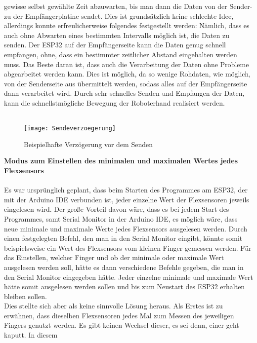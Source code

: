 \documentclass[titlepage,12pt,twoside]{article}
\begin{document}
gewisse selbst gewählte Zeit abzuwarten, bis man dann die Daten von der Sender- zu 
der Empfängerplatine sendet. Dies ist grundsätzlich keine schlechte Idee, allerdings 
konnte erfreulicherweise folgendes festgestellt werden: Nämlich, dass es auch ohne 
Abwarten eines bestimmten Intervalls möglich ist, die Daten zu senden. Der ESP32 auf 
der Empfängerseite kann die Daten genug schnell empfangen, ohne, dass ein bestimmter 
zeitlicher Abstand eingehalten werden muss. Das Beste daran ist, dass auch die 
Verarbeitung der Daten ohne Probleme abgearbeitet werden kann. Dies ist möglich, da 
so wenige Rohdaten, wie möglich, von der Senderseite aus übermittelt werden, sodass 
alles auf der Empfängerseite dann verarbeitet wird. Durch sehr schnelles Senden und 
Empfangen der Daten, kann die schnellstmögliche Bewegung der Roboterhand realisiert werden. \\
\\
\begin{figure}[H]
	\begin{center}
		\scalebox{0.5}
		{\texttt{[image: Sendeverzoegerung]}}
		\caption{Beispielhafte Verzögerung vor dem Senden}
		\label{fig:Sendeverzoegerung}			
	\end{center}
\end{figure}
\hfill \break
\textbf{Modus zum Einstellen des minimalen und maximalen Wertes jedes Flexsensors} \\
\\
Es war ursprünglich geplant, dass beim Starten des Programmes am ESP32, der mit der 
Arduino IDE verbunden ist, jeder einzelne Wert der Flexsensoren jeweils eingelesen 
wird. Der große Vorteil davon wäre, dass es bei jedem Start des Programmes, samt 
Serial Monitor in der Arduino IDE, es möglich wäre, dass neue minimale und maximale 
Werte jedes Flexsensors ausgelesen werden. Durch einen festgelegten Befehl, den man 
in den Serial Monitor eingibt, könnte somit beispielsweise ein Wert des Flexsensors 
vom kleinen Finger gemessen werden. Für das Einstellen, welcher Finger und ob der 
minimale oder maximale Wert ausgelesen werden soll, hätte es dann verschiedene 
Befehle gegeben, die man in den Serial Monitor eingegeben hätte. Jeder einzelne 
minimale und maximale Wert hätte somit ausgelesen werden sollen und bis zum Neustart 
des ESP32 erhalten bleiben sollen. \\
Dies stellte sich aber als keine sinnvolle Lösung heraus. Als Erstes ist zu erwähnen, 
dass dieselben Flexsensoren jedes Mal zum Messen des jeweiligen Fingers genutzt 
werden. Es gibt keinen Wechsel dieser, es sei denn, einer geht kaputt. In diesem 
\end{document}
